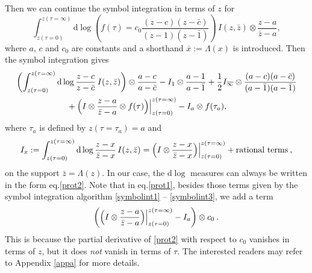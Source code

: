 \documentclass[a4paper,12pt]{article}
\newcommand{\dif}{\mathrm{d}} %
\begin{document}
Then we can continue the symbol integration in terms of $z$ for 
\begin{equation}\label{prot2}
    \int_{z(\tau=0)}^{z(\tau=\infty)} \dif \log\left(f(\tau)=c_0 \frac{(z-c) (z-\bar c)}{(z-1)(z-\bar 1)}\right)\,I(z,\bar z)\otimes \frac{z-a}{\bar z-a}, 
\end{equation}
where $a$, $c$ and $c_0$ are constants and a shorthand $\bar x:=\Lambda(x)$ is introduced. Then the symbol integration gives
\begin{align}
&\biggl(\int_{z(\tau=0)}^{z(\tau=\infty)} \dif \log\frac{z - c}{z - \bar c}\: I(z,\bar{z})\biggr)\otimes \frac{a - c}{a - \bar c} - 
I_1\otimes \frac{a-1}{a - \bar 1} +\frac{1}{2} I_{\overline{\infty}}\otimes \frac{(a-c) (a-\bar c)}{(a-\bar 1)(a-\bar{1})}   \nonumber\\
&\qquad \qquad \qquad +
 \Bigl(I\otimes \frac{z-a}{\bar z-a}\otimes f(\tau)\Bigr)\Bigr\vert_{z(\tau=0)}^{z(\tau=\infty)} - I_a\otimes f(\tau_a),\label{prot1}
\end{align}
where $\tau_a$ is defined by $z(\tau=\tau_a)=a$ and 
\[
I_x:=\int_{z(\tau=0)}^{z(\tau=\infty)} \dif \log\frac{z - x}{\bar z - x}\,I(z,\bar z)=\Bigl(I\otimes  \frac{z - x}{\bar z - x}\Bigr)\Bigr\vert_{z(\tau=0)}^{z(\tau=\infty)}+\text{rational terms} \:,
\]
on the support $\bar z=\Lambda(z)$. In our case, the $\dif \log$ measures can always be written in the form eq.\eqref{prot2}. Note that in eq.\eqref{prot1}, besides those terms given by the symbol integration algorithm \eqref{symbolint1} -- \eqref{symbolint3}, we add a term 
\[
    \biggl(\Bigl(I\otimes  \frac{z - a}{\bar z - a}\Bigr)\Bigr\vert_{z(\tau=0)}^{z(\tau=\infty)} - I_a\biggr)\otimes c_0 \:.
\]
This is because the partial derivative of \eqref{prot2} with respect to $c_0$ vanishes in terms of $z$, but it does \emph{not} vanish in terms of $\tau$. The interested readers may refer to Appendix \ref{appa} for more details.

\end{document}
